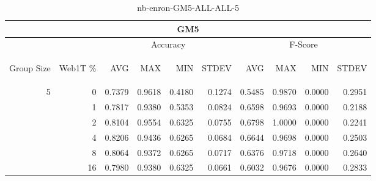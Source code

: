 \begin{center}
\begin{table}[htbp] 
 \begin{center}
\begin{tabular}{ | r | r | r | r | r | r | r | r | r | r |}
\hline
\multicolumn{10}{|c|}{GM5}\\
\hline
 & & \multicolumn{4}{|c|}{Accuracy} & \multicolumn{4}{|c|}{F-Score}\\ \cline{3-10}
\begin{sideways}Group Size\end{sideways} & \begin{sideways}Web1T \%\end{sideways} & \begin{sideways}AVG\end{sideways} & \begin{sideways}MAX\end{sideways} & \begin{sideways}MIN\end{sideways} & \begin{sideways}STDEV\end{sideways} & \begin{sideways}AVG\end{sideways} & \begin{sideways}MAX\end{sideways} & \begin{sideways}MIN\end{sideways} & \begin{sideways}STDEV\end{sideways}\\
\hline
\multirow{5}{*}{5}
 & 0 & 0.7379 & 0.9618 & 0.4180 & 0.1274 & 0.5485 & 0.9870 & 0.0000 & 0.2951\\ \cline{2-10}
 & 1 & 0.7817 & 0.9380 & 0.5353 & 0.0824 & 0.6598 & 0.9693 & 0.0000 & 0.2188\\ \cline{2-10}
 & 2 & 0.8104 & 0.9554 & 0.6325 & 0.0755 & 0.6798 & 1.0000 & 0.0000 & 0.2241\\ \cline{2-10}
 & 4 & 0.8206 & 0.9436 & 0.6265 & 0.0684 & 0.6644 & 0.9698 & 0.0000 & 0.2503\\ \cline{2-10}
 & 8 & 0.8064 & 0.9372 & 0.6265 & 0.0717 & 0.6376 & 0.9718 & 0.0000 & 0.2640\\ \cline{2-10}
 & 16 & 0.7980 & 0.9380 & 0.6325 & 0.0661 & 0.6032 & 0.9676 & 0.0000 & 0.2833\\ \cline{2-10}
\hline
\end{tabular}
\caption{nb-enron-GM5-ALL-ALL-5}
\label{table:nb-enron-GM5-ALL-ALL-5}
\end{center}
 \end{table}
\end{center}

